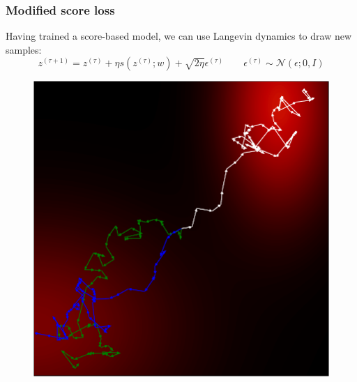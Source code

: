 \documentclass{beamer}
\begin{document}
\begin{frame}
    \frametitle{Modified score loss}
    Having trained a score-based model, we can use Langevin dynamics to draw new samples:
    \begin{equation*}
        z^{(\tau+1)}=z^{(\tau)}+\eta{}s(z^{(\tau)};w)+\sqrt{2\eta}\epsilon^{(\tau)}\qquad\epsilon^{(\tau)}\sim\mathcal{N}(\epsilon;0,I)
    \end{equation*}
    \begin{figure}
        \includegraphics[height=0.5\textheight]{Figure_6.pdf}
    \end{figure}
\end{frame}
\end{document}
